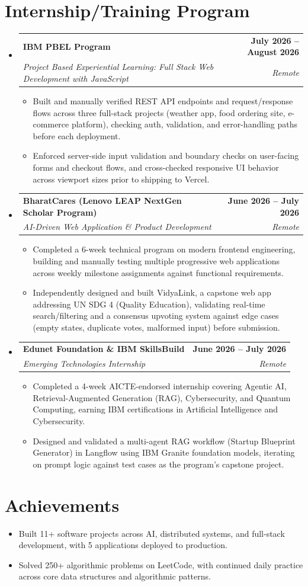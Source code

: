 \documentclass[letterpaper,10pt]{article}
\makeatletter
\newcommand{\resumeItem}[1]{
  \item\small{
    {#1 \vspace{-2pt}}
  }
}
\newcommand{\resumeSubheading}[4]{
  \vspace{-2pt}\item
    \begin{tabular*}{1.0\textwidth}[t]{l@{\extracolsep{\fill}}r}
      \textbf{#1} & \textbf{\small #2} \\
      \textit{\small#3} & \textit{\small #4} \\
    \end{tabular*}\vspace{-7pt}
}
\newcommand{\resumeSubHeadingListStart}{\begin{itemize}[leftmargin=0.0in, label={}]}
\newcommand{\resumeSubHeadingListEnd}{\end{itemize}}
\newcommand{\resumeItemListStart}{\begin{itemize}}
\newcommand{\resumeItemListEnd}{\end{itemize}\vspace{-5pt}}
\makeatother
\begin{document}
\section{Internship/Training Program}
  \resumeSubHeadingListStart
    \resumeSubheading
      {IBM PBEL Program}{July 2026 -- August 2026}
      {Project Based Experiential Learning: Full Stack Web Development with JavaScript}{Remote}
      \resumeItemListStart
        \resumeItem{Built and manually verified REST API endpoints and request/response flows across three full-stack projects (weather app, food ordering site, e-commerce platform), checking auth, validation, and error-handling paths before each deployment.}
        \resumeItem{Enforced server-side input validation and boundary checks on user-facing forms and checkout flows, and cross-checked responsive UI behavior across viewport sizes prior to shipping to Vercel.}
      \resumeItemListEnd
    \resumeSubheading
      {BharatCares (Lenovo LEAP NextGen Scholar Program)}{June 2026 -- July 2026}
      {AI-Driven Web Application \& Product Development}{Remote}
      \resumeItemListStart
        \resumeItem{Completed a 6-week technical program on modern frontend engineering, building and manually testing multiple progressive web applications across weekly milestone assignments against functional requirements.}
        \resumeItem{Independently designed and built VidyaLink, a capstone web app addressing UN SDG 4 (Quality Education), validating real-time search/filtering and a consensus upvoting system against edge cases (empty states, duplicate votes, malformed input) before submission.}
      \resumeItemListEnd
    \resumeSubheading
      {Edunet Foundation \& IBM SkillsBuild}{June 2026 -- July 2026}
      {Emerging Technologies Internship}{Remote}
      \resumeItemListStart
        \resumeItem{Completed a 4-week AICTE-endorsed internship covering Agentic AI, Retrieval-Augmented Generation (RAG), Cybersecurity, and Quantum Computing, earning IBM certifications in Artificial Intelligence and Cybersecurity.}
        \resumeItem{Designed and validated a multi-agent RAG workflow (Startup Blueprint Generator) in Langflow using IBM Granite foundation models, iterating on prompt logic against test cases as the program's capstone project.}
      \resumeItemListEnd
  \resumeSubHeadingListEnd
\vspace{-12pt}

\section{Achievements}
      \resumeItemListStart
\resumeItem{Built 11+ software projects across AI, distributed systems, and full-stack development, with 5 applications deployed to production.}
  \vspace{-16pt}
\resumeItem{Solved 250+ algorithmic problems on LeetCode, with continued daily practice across core data structures and algorithmic patterns.}
     \resumeItemListEnd
\end{document}
